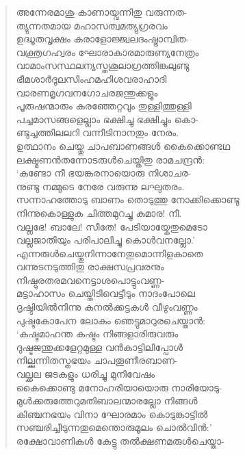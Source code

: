 \begin{verse}
അന്നേരമാശു കാണായ്വന്നിതു വരുന്നത-\\
ത്യുന്നതമായ മഹാസത്വമത്യുഗ്രരവം\\
ഉദ്ധൂതവൃക്ഷം കരാളോജ്ജ്വലദംഷ്ട്രാന്വിത-\\
വക്ത്രഗഹ്വരം ഘോരാകാരമാരുണ്യനേത്രം\\
വാമാംസസ്ഥലന്യസ്തശൂലാഗ്രത്തിങ്കലുണ്ടു\\
ഭീമശാര്‍ദൂലസിംഹമഹിശവരാഹാദി\\
വാരണമൃഗവനഗോചരജന്തുക്കളും\\
പൂരുഷന്മാരും കരഞ്ഞേറ്റവും തുള്ളിത്തുള്ളി\\
പച്ചമാസങ്ങളെല്ലാം ഭക്ഷിച്ചു ഭക്ഷിച്ചും കൊ-\\
ണ്ടുച്ചത്തിലലറി വന്നീടിനാനതും നേരം.\\
ഉത്ഥാനം ചെയ്തു ചാപബാണങ്ങള്‍ കൈക്കൊണ്ടഥ\\
ലക്ഷ്മണന്‍തന്നോടരുള്‍ചെയ്തിതു രാമചന്ദ്രന്‍:\\
‘കണ്ടോ നീ ഭയങ്കരനായൊരു നിശാചര-\\
നുണ്ടു നമ്മുടെ നേരേ വരുന്നു ലഘുതരം.\\
സന്നാഹത്തോടു ബാണം തൊടുത്തു നോക്കിക്കൊണ്ടു\\
നിന്നുകൊള്ളുക ചിത്തമുറച്ചു കുമാര! നീ.\\
വല്ലഭേ! ബാലേ! സീതേ! പേടിയായ്കേതുമെടോ\\
വല്ലജാതിയും പരിപാലിച്ചു കൊള്‍വനല്ലോ.’\\
എന്നരുള്‍ചെയ്തുനിന്നാനേതുമൊന്നിളകാതെ\\
വന്നുടനടുത്തിതു രാക്ഷസപ്രവരനും\\
നിഷ്ഠുരതരമവനെട്ടാശപൊട്ടുംവണ്ണ-\\
മട്ടാഹാസം ചെയ്തിടിവെട്ടീടും നാദംപോലെ\\
ദൃഷ്ടിയില്‍നിന്നു കനല്‍ക്കട്ടകള്‍ വീഴുംവണ്ണം\\
പുഷ്ടകോപേന ലോകം ഞെട്ടുമാറുരചെയ്താന്‍:\\
‘കഷ്ടമാഹന്ത കഷ്ടം നിങ്ങളാരിരുവരും\\
ദുഷ്ടജന്തുക്കളേറ്റമുള്ള വന്‍കാട്ടിലിപ്പോള്‍\\
നില്ക്കുന്നിതസ്തഭയം ചാപതൂണീരബാണ-\\
വല്ക്കല ജടകളും ധരിച്ചു മുനിവേഷം\\
കൈക്കൊണ്ടു മനോഹരിയായൊരു നാരിയോടു-\\
മുള്‍ക്കരുത്തേറുമതിബാലന്മാരല്ലോ നിങ്ങള്‍\\
കിഞ്ചനഭയം വിനാ ഘോരമാം കൊടുങ്കാട്ടില്‍\\
സഞ്ചരിച്ചീടുന്നതുമെന്തൊരുമൂലം ചൊല്‍വിന്‍:’\\
രക്ഷോവാണികള്‍ കേട്ടു തല്‍ക്ഷണമരുള്‍ചെയ്താ-\\

\end{verse}
